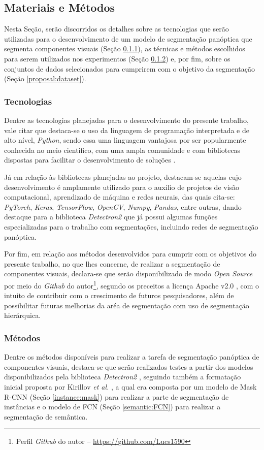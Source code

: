 \subsection{Materiais e Métodos}
\label{proposal:matmet}
Nesta Seção, serão discorridos os detalhes sobre as tecnologias que serão utilizadas para o desenvolvimento de um modelo de segmentação panóptica que segmenta componentes visuais (Seção \ref{proposal:tec}), as técnicas e métodos escolhidos para serem utilizados nos experimentos (Seção \ref{proposal:method}) e, por fim, sobre os conjuntos de dados selecionados para cumprirem com o objetivo da segmentação (Seção \ref{proposal:dataset}).


\subsubsection{Tecnologias}
\label{proposal:tec}
Dentre as tecnologias planejadas para o desenvolvimento do presente trabalho, vale citar que destaca-se o uso da linguagem de programação interpretada e de alto nível, \textit{Python}, sendo essa uma linguagem vantajosa por ser popularmente conhecida no meio cientifico, com uma ampla comunidade e com  bibliotecas dispostas para facilitar o desenvolvimento de soluções \cite{Millman2011PythonEngineers}.

Já em relação às bibliotecas planejadas ao projeto, destacam-se aquelas cujo desenvolvimento é amplamente utilizado para o auxilio de projetos de visão computacional, aprendizado de máquina e redes neurais, das quais cita-se: \textit{PyTorch}, \textit{Keras}, \textit{TensorFlow}, \textit{OpenCV}, \textit{Numpy}, \textit{Pandas}, entre outras, dando destaque para a biblioteca \textit{Detectron2} \cite{detectron2} que já possui algumas funções especializadas para o trabalho com segmentações, incluindo redes de segmentação panóptica.

Por fim, em relação aos métodos desenvolvidos para cumprir com os objetivos do presente trabalho, no que lhes concerne, de realizar a segmentação de componentes visuais, declara-se que serão disponibilizado de modo \textit{Open Source} por meio do \textit{Github} do autor\footnote{Perfil \textit{Github} do autor – \url{https://github.com/Lucs1590}}, segundo os preceitos a licença Apache v2.0 \cite{Licenses}, com o intuito de contribuir com o crescimento de futuros pesquisadores, além de possibilitar futuras melhorias da aréa de segmentação com uso de segmentação hierárquica.


\subsubsection{Métodos}
\label{proposal:method}
Dentre os métodos disponíveis para realizar a tarefa de segmentação panóptica de componentes visuais, destaca-se que serão realizados testes a partir dos modelos disponibilizados pela biblioteca \textit{Detectron2} \cite{detectron2}, seguindo também a formatação inicial proposta por Kirillov \textit{et al.} \cite{Kirillov2019a}, a qual era composta por um modelo de Mask R-CNN (Seção \ref{instance:mask}) para realizar a parte de segmentação de instâncias e o modelo de FCN (Seção \ref{semantic:FCN}) para realizar a segmentação de semântica.

